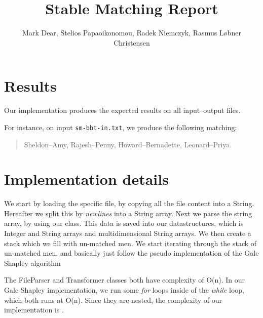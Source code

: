 \documentclass{tufte-handout}
\title{Stable Matching Report}
\author{Mark Dear, Stelios Papaoikonomou, Radek Niemczyk, Rasmus Løbner Christensen}
\begin{document}
  \maketitle

  \section{Results}
  
  Our implementation produces the expected results on all input--output files. 
 
  For instance, on input {\tt sm-bbt-in.txt}, we produce the following matching:
  \begin{quotation}
    Sheldon--Amy, Rajesh--Penny, Howard--Bernadette, Leonard--Priya. 
  \end{quotation}

  \section{Implementation details}
  
  We start by loading the specific file, by copying all the file content into a String. Hereafter we split this by \textit{newlines} into a String array.
  Next we parse the string array, by using our class. This data is saved into our datastructures, which is Integer and
  String arrays and multidimensional String arrays. We then create a stack which we fill with un-matched men. 
  We start iterating through the stack of un-matched men, and basically just follow the pseudo implementation of the Gale Shapley algorithm 
  
  The FileParser and Transformer classes both have complexity of O(n). In our Gale Shapley implementation, we run some \textit{for} loops inside of the \textit{while} loop,
  which both runs at O(n). Since they are nested, the complexity of our implementation is . 
\end{document}
